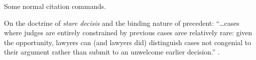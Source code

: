 



\usepackage{tikz}
\usetikzlibrary{shadows,backgrounds}



\usepackage[
				bookmarks,
            colorlinks=true,        
            allcolors = black,  
            citecolor=blue, 
            hyperindex=false,       
]{hyperref}

\newcommand\theball{\tikz \shade[ball color=green!40] (0,0) circle (0.75ex);\hspace{0.75em}}




\noindent Some normal citation commands.
\bigskip
%
%
%
%

\bigskip

\setnumparshiftleft{\hspace{-2em}\theball\hspace{1.5em}}
\setnumparfillright{\hspace{0.5em}---\hspace{0.5em}}
\setnumpardelimpost{}

\p On the doctrine of \textit{stare decisis} and the binding nature of precedent: ``\ldots cases where judges are entirely constrained by previous cases aree relatively rare: given the opportunity, lawyers can (and lawyers did) distinguish cases not congenial to their argument rather than submit to an unwelcome earlier decision.'' \parencite[52]{precedent}.

